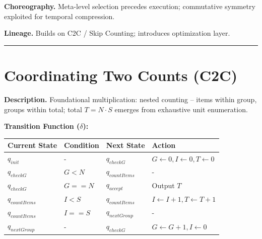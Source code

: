 \documentclass[12pt]{book}
\begin{document}
\textbf{Choreography.} Meta-level selection precedes execution;
commutative symmetry exploited for temporal compression.

\textbf{Lineage.} Builds on C2C / Skip Counting; introduces optimization
layer.

\begin{center}\rule{0.5\linewidth}{0.5pt}\end{center}

\section{Coordinating Two Counts
(C2C)}\label{coordinating-two-counts-c2c}

\textbf{Description.} Foundational multiplication: nested
counting -- items within group, groups within total; total
\(T = N \cdot S\) emerges from exhaustive unit enumeration.

\textbf{Transition Function (\(\delta\)):}

\begin{longtable}[]{@{}
  >{\raggedright\arraybackslash}p{}
  >{\raggedright\arraybackslash}p{}
  >{\raggedright\arraybackslash}p{}
  >{\raggedright\arraybackslash}p{}@{}}
\toprule\noalign{}
\begin{minipage}[b]{\linewidth}\raggedright
Current State
\end{minipage} & \begin{minipage}[b]{\linewidth}\raggedright
Condition
\end{minipage} & \begin{minipage}[b]{\linewidth}\raggedright
Next State
\end{minipage} & \begin{minipage}[b]{\linewidth}\raggedright
Action
\end{minipage} \\
\midrule\noalign{}
\endhead
\bottomrule\noalign{}
\endlastfoot
\(q_{init}\) & - & \(q_{checkG}\) &
\(G \leftarrow 0, I \leftarrow 0, T \leftarrow 0\) \\
\(q_{checkG}\) & \(G < N\) & \(q_{countItems}\) & - \\
\(q_{checkG}\) & \(G == N\) & \(q_{accept}\) & Output \(T\) \\
\(q_{countItems}\) & \(I < S\) & \(q_{countItems}\) &
\(I \leftarrow I+1, T \leftarrow T+1\) \\
\(q_{countItems}\) & \(I == S\) & \(q_{nextGroup}\) & - \\
\(q_{nextGroup}\) & - & \(q_{checkG}\) &
\(G \leftarrow G+1, I \leftarrow 0\) \\
\end{longtable}
\end{document}
